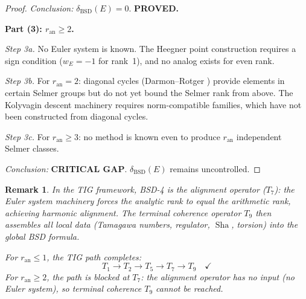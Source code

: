 \documentclass[11pt]{article}
\newtheorem{remark}[theorem]{Remark}
\DeclareMathOperator{\Sha}{Sha}
\begin{document}
\begin{proof}
\emph{Conclusion:} $\delta_{\mathrm{BSD}}(E) = 0$.  \textbf{PROVED.}

\textbf{Part (3): $r_{\mathrm{an}} \geq 2$.}

\emph{Step 3a.}  No Euler system is known.  The Heegner point construction
requires a sign condition ($w_E = -1$ for rank~1), and no analog exists for
even rank.

\emph{Step 3b.}  For $r_{\mathrm{an}} = 2$: diagonal cycles
(Darmon--Rotger \cite{DR}) provide elements in certain Selmer groups but do
not yet bound the Selmer rank from above.  The Kolyvagin descent machinery
requires norm-compatible families, which have not been constructed from
diagonal cycles.

\emph{Step 3c.}  For $r_{\mathrm{an}} \geq 3$: no method is known even
to produce $r_{\mathrm{an}}$ independent Selmer classes.

\emph{Conclusion:} \textbf{CRITICAL GAP}.  $\delta_{\mathrm{BSD}}(E)$
remains uncontrolled.
\end{proof}

\begin{remark}
\label{rem:T7-alignment}
In the TIG framework, BSD-4 is the \emph{alignment operator} ($T_7$): the
Euler system machinery forces the analytic rank to equal the arithmetic rank,
achieving harmonic alignment.  The terminal coherence operator $T_9$ then
assembles all local data (Tamagawa numbers, regulator, $\Sha$, torsion) into
the global BSD formula.

For $r_{\mathrm{an}} \leq 1$, the TIG path completes:
\[
  T_1 \to T_2 \to T_5 \to T_7 \to T_9 \quad\checkmark
\]
For $r_{\mathrm{an}} \geq 2$, the path is blocked at $T_7$: the alignment
operator has no input (no Euler system), so terminal coherence $T_9$ cannot be
reached.
\end{remark}
\end{document}
